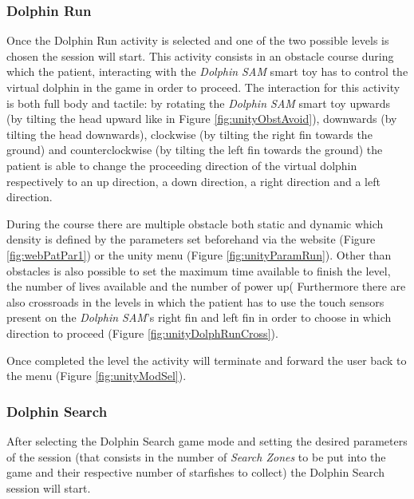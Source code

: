 \subsubsection{Dolphin Run}
Once the Dolphin Run activity is selected and one of the two possible levels is chosen the session will start.
This activity consists in an obstacle course during which the patient, interacting with the \textit{Dolphin SAM} smart toy has to control the virtual dolphin in the game in order to proceed.
The interaction for this activity is both full body and tactile: by rotating the \textit{Dolphin SAM} smart toy upwards (by tilting the head upward like in Figure \ref{fig:unityObstAvoid}), downwards (by tilting the head downwards), clockwise (by tilting the right fin towards the ground) and counterclockwise (by tilting the left fin towards the ground) the patient is able to change the proceeding direction of the virtual dolphin respectively to an up direction, a down direction, a right direction and a left direction.

During the course there are multiple obstacle both static and dynamic which density is defined by the parameters set beforehand via the website (Figure \ref{fig:webPatPar1}) or the unity menu (Figure \ref{fig:unityParamRun}). Other than obstacles is also possible to set the maximum time available to finish the level, the number of lives available and the number of power up(%
 Furthermore there are also crossroads in the levels in which the patient has to use the touch sensors present on the \textit{Dolphin SAM}'s right fin and left fin in order to choose in which direction to proceed (Figure \ref{fig:unityDolphRunCross}).

Once completed the level the activity will terminate and forward the user back to the menu (Figure \ref{fig:unityModSel}).
\subsubsection{Dolphin Search}
After selecting the Dolphin Search game mode and setting the desired parameters of the session (that consists in the number of \textit{Search Zones} to be put into the game and their respective number of starfishes to collect) the Dolphin Search session will start.

